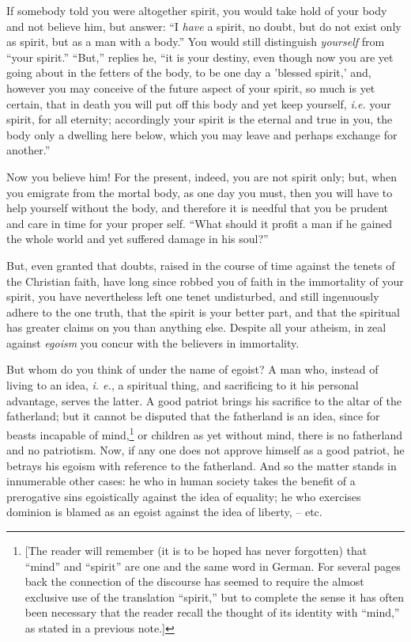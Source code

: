 \documentclass[12pt,a4paper]{book}
\begin{document}
If somebody told you were altogether spirit, you would take hold of your body 
and not believe him, but answer: ``I \textit{have} a spirit, no doubt, but do 
not exist only as spirit, but as a man with a body.'' You would still 
distinguish \textit{yourself} from ``your spirit.'' ``But,'' replies he, 
``it is your destiny, even though now you are yet going about in the fetters 
of the body, to be one day a 'blessed spirit,' and, however you may conceive 
of the future aspect of your spirit, so much is yet certain, that in death you 
will put off this body and yet keep yourself, \textit{i.e.} your spirit, for 
all eternity; accordingly your spirit is the eternal and true in you, the body 
only a dwelling here below, which you may leave and perhaps exchange for 
another.''

Now you believe him! For the present, indeed, you are not spirit only; but, 
when you emigrate from the mortal body, as one day you must, then you will 
have to help yourself without the body, and therefore it is needful that you 
be prudent and care in time for your proper self. ``What should it profit a 
man if he gained the whole world and yet suffered damage in his soul?''

But, even granted that doubts, raised in the course of time against the tenets 
of the Christian faith, have long since robbed you of faith in the immortality 
of your spirit, you have nevertheless left one tenet undisturbed, and still 
ingenuously adhere to the one truth, that the spirit is your better part, and 
that the spiritual has greater claims on you than anything else. Despite all 
your atheism, in zeal against \textit{egoism} you concur with the believers in 
immortality.

But whom do you think of under the name of egoist? A man who, instead of 
living to an idea, \textit{i. e.}, a spiritual thing, and sacrificing to it 
his personal advantage, serves the latter. A good patriot brings his sacrifice 
to the altar of the fatherland; but it cannot be disputed that the fatherland 
is an idea, since for beasts incapable of mind,\footnote{[The reader will 
remember (it is to be hoped has never forgotten) that ``mind'' and 
``spirit'' are one and the same word in German. For several pages back the 
connection of the discourse has seemed to require the almost exclusive use of 
the translation ``spirit,'' but to complete the sense it has often been 
necessary that the reader recall the thought of its identity with ``mind,'' 
as stated in a previous note.]} or children as yet without mind, there is no 
fatherland and no patriotism. Now, if any one does not approve himself as a 
good patriot, he betrays his egoism with reference to the fatherland. And so 
the matter stands in innumerable other cases: he who in human society takes 
the benefit of a prerogative sins egoistically against the idea of equality; 
he who exercises dominion is blamed as an egoist against the idea of liberty, 
-- etc.
\end{document}
